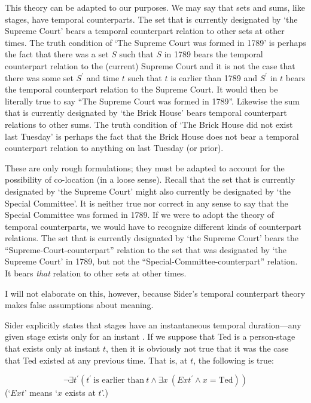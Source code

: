 \documentclass[12pt,twoside]{reedfancy}
\begin{document}
\begin{spacing}{1.25}
This theory can be adapted to our purposes.  We may say that sets and
sums, like stages, have temporal counterparts.  The set that is
currently designated by `the Supreme Court' bears a temporal
counterpart relation to other sets at other times.  The truth
condition of `The Supreme Court was formed in 1789' is perhaps the
fact that there was a set $S$ such that $S$ in 1789 bears the temporal
counterpart relation to the (current) Supreme Court and it is not the
case that there was some set $S^{\prime}$ and time $t$ such that $t$
is earlier than 1789 and $S^{\prime}$ in $t$ bears the temporal
counterpart relation to the Supreme Court.  It would then be literally
true to say ``The Supreme Court was formed in 1789''.  Likewise the
sum that is currently designated by `the Brick House' bears temporal
counterpart relations to other sums.  The truth condition of `The
Brick House did not exist last Tuesday' is perhaps the fact that the
Brick House does not bear a temporal counterpart relation to anything
on last Tuesday (or prior).

These are only rough formulations; they must be adapted to account for
the possibility of co-location (in a loose sense).  Recall that the
set that is currently designated by `the Supreme Court' might also
currently be designated by `the Special Committee'.  It is neither
true nor correct in any sense to say that the Special Committee was
formed in 1789.  If we were to adopt the theory of temporal
counterparts, we would have to recognize different kinds of
counterpart relations.  The set that is currently designated by `the
Supreme Court' bears the ``Supreme-Court-counterpart'' relation to the
set that was designated by `the Supreme Court' in 1789, but not the
``Special-Committee-counterpart'' relation.  It bears {\em that}
relation to other sets at other times.

I will not elaborate on this, however, because Sider's temporal
counterpart theory makes false assumptions about meaning.

Sider explicitly states that stages have an instantaneous temporal
duration---any given stage exists only for an instant
\citeyearpar[xiv]{sider2001}.  If we suppose that Ted is a
person-stage that exists only at instant $t$, then it is obviously not
true that it was the case that Ted existed at any previous time.  That
is, at $t$, the following is true:

\begin{displaymath}
\neg \exists t^{\prime} (t^{\prime}\ \text{is earlier than}\ t \wedge
\exists x\ (Ext^{\prime} \wedge x = \text{Ted}))
\end{displaymath}
(`$Ext$' means `$x$ exists at $t$'.)


\end{spacing}
\end{document}
